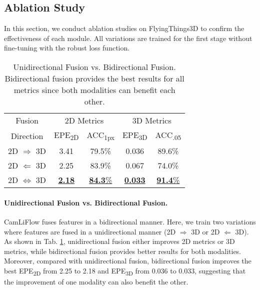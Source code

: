 \documentclass[10pt,twocolumn,letterpaper]{article}
\begin{document}
\subsection{Ablation Study}
\label{sec:ablation}

In this section, we conduct ablation studies on FlyingThings3D to confirm the effectiveness of each module. All variations are trained for the first stage without fine-tuning with the robust loss function.

\begin{table}[t]
    \centering
    \begin{tabular}{c|cc|cc}
    \hline
    Fusion & \multicolumn{2}{c|}{2D Metrics} & \multicolumn{2}{c}{3D Metrics} \\
    Direction & EPE\textsubscript{2D} & ACC\textsubscript{1px} & EPE\textsubscript{3D} & ACC\textsubscript{.05} \\
    \hline
    2D $\Rightarrow$ 3D      & 3.41 & 79.5\% & 0.036 & 89.6\% \\
    2D $\Leftarrow$ 3D       & 2.25 & 83.9\% & 0.067 & 74.0\% \\
    2D $\Leftrightarrow$ 3D  & \underline{\textbf{2.18}} & \underline{\textbf{84.3}\%} & \underline{\textbf{0.033}} & \underline{\textbf{91.4}\%} \\
    \hline
    \end{tabular}
    \vspace{-5pt}
    \caption{Unidirectional Fusion vs. Bidirectional Fusion. Bidirectional fusion provides the best results for all metrics since both modalities can benefit each other.}
    \vspace{-15pt}
    \label{tab:ablation-fusion-direction}
\end{table}

\vspace{-10pt}
\paragraph{Unidirectional Fusion vs. Bidirectional Fusion.} CamLiFlow fuses features in a bidirectional manner. Here, we train two variations where features are fused in a unidirectional manner (2D $\Rightarrow$ 3D or 2D $\Leftarrow$ 3D). As shown in Tab. \ref{tab:ablation-fusion-direction}, unidirectional fusion either improves 2D metrics or 3D metrics, while bidirectional fusion provides better results for both modalities. Moreover, compared with unidirectional fusion, bidirectional fusion improves the best EPE\textsubscript{2D} from 2.25 to 2.18 and EPE\textsubscript{3D} from 0.036 to 0.033, suggesting that the improvement of one modality can also benefit the other.
\end{document}
